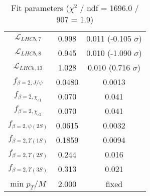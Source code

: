 \begin{table}[h!]
\begin{tabular}{c|c|c}
$\mathcal L_{LHCb,7}$ & 0.998 & 0.011 (-0.105 $\sigma$) \\
$\mathcal L_{LHCb,8}$ & 0.945 & 0.010 (-1.090 $\sigma$) \\
$\mathcal L_{LHCb,13}$ & 1.028 & 0.010 (0.716 $\sigma$) \\
$f_{\beta=2,J/\psi}$ & 0.0480 & 0.0013 \\
$f_{\beta=2,\chi_{c1}}$ & 0.070 & 0.041 \\
$f_{\beta=2,\chi_{c2}}$ & 0.070 & 0.041 \\
$f_{\beta=2,\psi(2S)}$ & 0.0615 & 0.0032 \\
$f_{\beta=2,\Upsilon(1S)}$ & 0.1859 & 0.0094 \\
$f_{\beta=2,\Upsilon(2S)}$ & 0.244 & 0.016 \\
$f_{\beta=2,\Upsilon(3S)}$ & 0.313 & 0.021 \\
min $p_T/M$ & 2.000 & fixed \\
\end{tabular}
\caption{Fit parameters ($\chi^2$ / ndf = 1696.0 / 907 = 1.9)}
\end{table}
